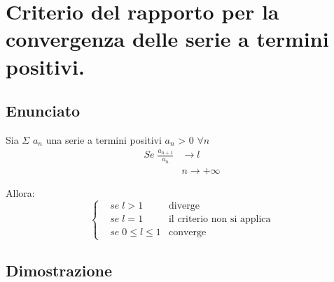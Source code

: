 \documentclass[../dimostrazioni]{subfiles}
\begin{document}
    \chapter{Criterio del rapporto per la convergenza delle serie a termini positivi.}
    \label{criterioRapportoSerie}

        \section*{Enunciato}

            Sia \(\Sigma\) \(a_n\) una serie a termini positivi \(a_n\) > 0 \(\forall n\)
            \begin{align*}
                Se \; \frac{a_{n+1}}{a_n} &\longrightarrow l \\
                &n  \rightarrow +\infty
            \end{align*}
            
            Allora:
            \[
                \left\{
                    \begin{aligned}
                        &se \; l > 1 & \text{diverge} \\
                        &se \; l = 1 & \text{il criterio non si applica} \\
                        &se \; 0 \leqslant l \leqslant 1 & \text{converge}
                    \end{aligned}
                \right.
            \]
            
        \section*{Dimostrazione}
\end{document}
